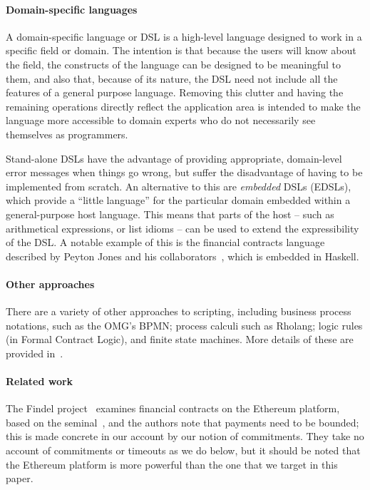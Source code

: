 \documentclass[runningheads]{llncs}
\begin{document}
\paragraph{Domain-specific languages} 

A domain-specific language or DSL is a high-level language designed to work in a specific field or domain. The intention 
is that because the users will know about the field, the constructs of the language can be designed to be meaningful to 
them, and also that, because of its nature, the DSL need not include all the features of a general purpose language. 
Removing this clutter and having the remaining operations directly reflect the application area is intended to make the 
language more accessible to domain experts who do not necessarily see themselves as programmers.

Stand-alone DSLs have the advantage of providing appropriate, domain-level error messages when things go wrong, but 
suffer the disadvantage of having to be implemented from scratch. An alternative to this are \emph{embedded} DSLs 
(EDSLs), which provide a ``little language'' for the particular domain embedded within a general-purpose host language. 
This means that parts of the host -- such as arithmetical expressions, or list idioms --  can be used to extend the 
expressibility of the DSL. A notable example of this is the financial contracts language described by Peyton Jones and 
his collaborators~\cite{PeytonJones:2000}, which is embedded in Haskell.

\paragraph{Other approaches}

There are a variety of other approaches to scripting, including business process notations, such as the OMG's BPMN; 
process calculi such as Rholang; logic rules (in Formal Contract Logic), and finite state machines. More details of 
these are provided in~\cite{cryptoeprint:2016:1156}.

\paragraph{Related work}

The Findel project~\cite{findel} examines financial contracts on the Ethereum platform, based on the 
seminal~\cite{PeytonJones:2000}, and the authors note that payments need to be bounded; this is made concrete in our 
account by our notion of commitments. They take no account of commitments or timeouts as we do below, but it should be 
noted that the Ethereum platform is more powerful than the one that we target in this paper.
\end{document}
